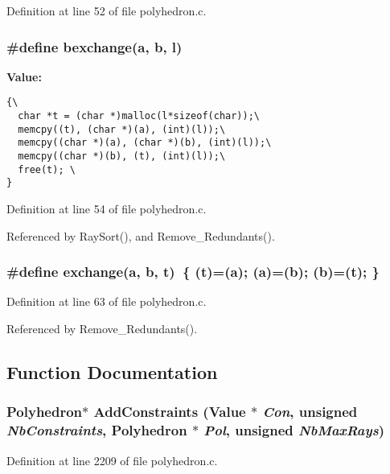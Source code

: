 Definition at line 52 of file polyhedron.c.
\subsubsection{\setlength{\rightskip}{0pt plus 5cm}\#define bexchange(a, b, l)}\label{polyhedron_8c_a1}


{\bf Value:}

\footnotesize\begin{verbatim}{\
  char *t = (char *)malloc(l*sizeof(char));\
  memcpy((t), (char *)(a), (int)(l));\
  memcpy((char *)(a), (char *)(b), (int)(l));\
  memcpy((char *)(b), (t), (int)(l));\
  free(t); \
}\end{verbatim}\normalsize 


Definition at line 54 of file polyhedron.c.

Referenced by Ray\-Sort(), and Remove\_\-Redundants().

\subsubsection{\setlength{\rightskip}{0pt plus 5cm}\#define exchange(a, b, t)\ \{ (t)=(a); (a)=(b); (b)=(t); \}}\label{polyhedron_8c_a2}




Definition at line 63 of file polyhedron.c.

Referenced by Remove\_\-Redundants().



\subsection{Function Documentation}
\subsubsection{\setlength{\rightskip}{0pt plus 5cm}Polyhedron$\ast$ Add\-Constraints (Value $\ast$ {\em Con}, unsigned {\em Nb\-Constraints}, Polyhedron $\ast$ {\em Pol}, unsigned {\em Nb\-Max\-Rays})}\label{polyhedron_8c_a28}




Definition at line 2209 of file polyhedron.c.

